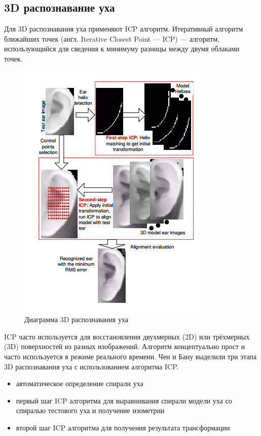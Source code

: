 \documentclass[12pt,a4paper]{article}					%
\begin{document}

\subsection{3D распознавание уха}

Для 3D распознавания уха применяют ICP алгоритм.
Итеративный алгоритм ближайших точек (англ. Iterative Closest Point — ICP) — алгоритм, использующийся для сведения к минимуму разницы между двумя облаками точек. 

\begin{figure}[h!]
\centering
\includegraphics[scale=1.0]{res/icp_steps}
\caption{Диаграмма 3D распознавания уха}
\end{figure}

ICP часто используется для восстановления двухмерных (2D) или трёхмерных (3D) поверхностей из разных изображений.
Алгоритм концептуально прост и часто используется в режиме реального времени.
Чен и Бану выделили три этапа 3D распознавания уха с использованием алгоритма ICP.
\begin{itemize}
\item автоматическое определение спирали уха
\item первый шаг ICP алгоритма для выравнивания спирали модели уха со спиралью тестового уха и получение изометрии
\item второй шаг ICP алгоритма для получения результата трансформации
\end{itemize}
\end{document}
